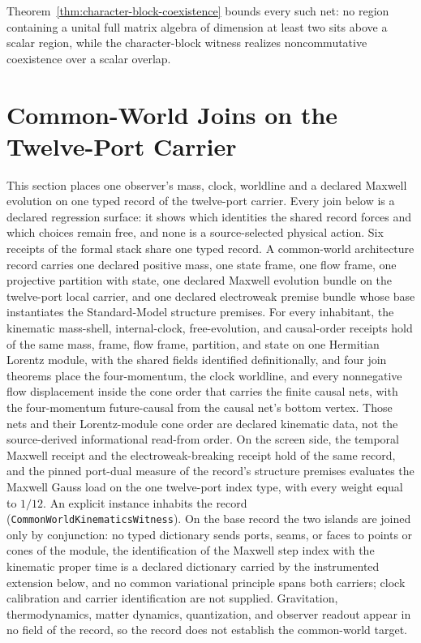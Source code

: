 \documentclass[11pt]{article}
\newcounter{none}
\begin{document}
Theorem~\ref{thm:character-block-coexistence} bounds every such net: no
region containing a unital full matrix algebra of dimension at least two sits
above a scalar region, while the character-block witness realizes
noncommutative coexistence over a scalar overlap.



\section{Common-World Joins on the Twelve-Port Carrier}
\label{sec:common-world}

This section places one observer's mass, clock, worldline and a declared
Maxwell evolution on one typed record of the twelve-port carrier. Every join
below is a declared regression surface: it shows which identities the shared
record forces and which choices remain free, and none is a source-selected
physical action. Six receipts of the formal stack share one typed record. A common-world
architecture record carries one declared positive mass, one state frame,
one flow frame, one projective partition with state, one declared Maxwell
evolution bundle on the twelve-port local carrier, and one declared
electroweak premise bundle whose base instantiates the Standard-Model
structure premises. For every inhabitant, the kinematic mass-shell,
internal-clock, free-evolution, and causal-order receipts hold of the same
mass, frame, flow frame, partition, and state on one Hermitian Lorentz
module, with the shared fields identified definitionally, and four join
theorems place the four-momentum, the clock worldline, and every
nonnegative flow displacement inside the cone order that carries the
finite causal nets, with the four-momentum future-causal from the causal
net's bottom vertex. Those nets and their Lorentz-module cone order are
declared kinematic data, not the source-derived informational read-from
order. On the screen side, the temporal Maxwell receipt and
the electroweak-breaking receipt hold of the same record, and the pinned
port-dual measure of the record's structure premises evaluates the Maxwell
Gauss load on the one twelve-port index type, with every weight equal to
\(1/12\). An explicit instance inhabits the record
(\texttt{CommonWorldKinematicsWitness}). On the base
record the two islands are joined only by conjunction: no typed dictionary sends
ports, seams, or faces to points or cones of the module, the identification
of the Maxwell step index with the kinematic proper time is a declared
dictionary carried by the instrumented extension below, and no common
variational principle spans both carriers; clock calibration and carrier
identification are not supplied.
Gravitation, thermodynamics, matter dynamics, quantization, and observer
readout appear in no field of the record, so the record does not establish
the common-world target.
\end{document}
